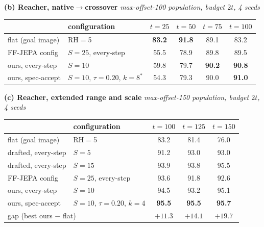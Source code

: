 \documentclass{article}
\newcommand{\ours}[1]{\textbf{#1}}
\begin{document}
\begin{table}[h]
\vspace{8pt}
\textbf{(b) Reacher, native$\to$crossover} \quad \emph{max-offset-100 population,
budget $2t$, 4 seeds}

\vspace{2pt}
\begin{tabular}{llcccc}
\toprule
& configuration & $t{=}25$ & $t{=}50$ & $t{=}75$ & $t{=}100$ \\
\midrule
flat (goal image)   & RH$=$5                             & \ours{83.2} & \ours{91.8} & 89.1 & 83.2 \\
FF-JEPA config      & $S{=}25$, every-step               & 55.5 & 78.9 & 89.8 & 89.5 \\
ours, every-step    & $S{=}10$                           & 59.8 & 79.7 & \ours{90.2} & \ours{90.8} \\
ours, spec-accept   & $S{=}10$, $\tau{=}0.20$, $k{=}8^{\ast}$ & 54.3 & 79.3 & 90.0 & \ours{91.0} \\
\bottomrule
\end{tabular}

\vspace{8pt}
\textbf{(c) Reacher, extended range and scale} \quad \emph{max-offset-150
population, budget $2t$, 4 seeds}

\vspace{2pt}
\begin{tabular}{llccc}
\toprule
& configuration & $t{=}100$ & $t{=}125$ & $t{=}150$ \\
\midrule
flat (goal image)   & RH$=$5                             & 83.2 & 81.4 & 76.0 \\
drafted, every-step & $S{=}5$                            & 91.2 & 93.0 & 93.0 \\
drafted, every-step & $S{=}15$                           & 93.9 & 93.8 & 95.5 \\
FF-JEPA config      & $S{=}25$, every-step               & 93.6 & 91.8 & 92.6 \\
ours, every-step    & $S{=}10$                           & 94.5 & 93.2 & 95.1 \\
ours, spec-accept   & $S{=}10$, $\tau{=}0.20$, $k{=}4$    & \ours{95.5} & \ours{95.5} & \ours{95.7} \\
\midrule
\multicolumn{2}{l}{gap (best ours $-$ flat)} & $+11.3$ & $+14.1$ & $+19.7$ \\
\bottomrule
\end{tabular}
\end{table}
\end{document}
